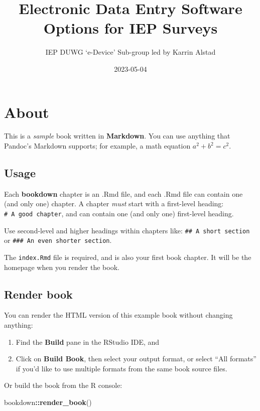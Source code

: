 \documentclass[
]{book}
\title{Electronic Data Entry Software Options for IEP Surveys}
\author{IEP DUWG `e-Device' Sub-group led by Karrin Alstad}
\date{2023-05-04}
\newenvironment{Shaded}{\begin{snugshade}}{\end{snugshade}}
\newcommand{\FunctionTok}[1]{\textcolor[rgb]{0.13,0.29,0.53}{\textbf{#1}}}
\newcommand{\NormalTok}[1]{#1}
\newcommand{\SpecialCharTok}[1]{\textcolor[rgb]{0.81,0.36,0.00}{\textbf{#1}}}
\theoremstyle{definition}
\theoremstyle{definition}
\theoremstyle{definition}
\theoremstyle{definition}
\theoremstyle{remark}
\begin{document}
\maketitle

{
\setcounter{tocdepth}{1}
\tableofcontents
}
\hypertarget{about}{%
\chapter{About}\label{about}}

This is a \emph{sample} book written in \textbf{Markdown}. You can use anything that Pandoc's Markdown supports; for example, a math equation \(a^2 + b^2 = c^2\).

\hypertarget{usage}{%
\section{Usage}\label{usage}}

Each \textbf{bookdown} chapter is an .Rmd file, and each .Rmd file can contain one (and only one) chapter. A chapter \emph{must} start with a first-level heading: \texttt{\#\ A\ good\ chapter}, and can contain one (and only one) first-level heading.

Use second-level and higher headings within chapters like: \texttt{\#\#\ A\ short\ section} or \texttt{\#\#\#\ An\ even\ shorter\ section}.

The \texttt{index.Rmd} file is required, and is also your first book chapter. It will be the homepage when you render the book.

\hypertarget{render-book}{%
\section{Render book}\label{render-book}}

You can render the HTML version of this example book without changing anything:

\begin{enumerate}
\def\labelenumi{\arabic{enumi}.}
\item
  Find the \textbf{Build} pane in the RStudio IDE, and
\item
  Click on \textbf{Build Book}, then select your output format, or select ``All formats'' if you'd like to use multiple formats from the same book source files.
\end{enumerate}

Or build the book from the R console:

\begin{Shaded}
\begin{Highlighting}[]
\NormalTok{bookdown}\SpecialCharTok{::}\FunctionTok{render\_book}\NormalTok{()}
\end{Highlighting}
\end{Shaded}
\end{document}
